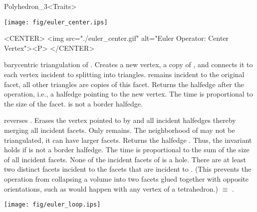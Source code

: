 \begin{ccRefClass}{Polyhedron_3<Traits>}
\begin{ccTexOnly}
    \begin{center}
      \parbox{0.52\textwidth}{%
          \texttt{[image: fig/euler\_center.ips]}%
      }
    \end{center}
\end{ccTexOnly}

\begin{ccHtmlOnly}
    <CENTER>
    <img src="./euler_center.gif" alt="Euler Operator: Center Vertex"><P>
    </CENTER>
\end{ccHtmlOnly}

    {barycentric triangulation of . Creates a new vertex,
     a copy of , and connects it to each vertex incident 
     to  splitting  into triangles. 
      remains incident to the original facet, all other triangles 
     are copies of this facet. Returns the halfedge 
     after the operation, i.e., a halfedge pointing to the new vertex.
     The time is proportional to the size of the facet.
     \ccPrecond {} is not a border halfedge.}

    {reverses . Erases the
     vertex pointed to by  and all incident halfedges thereby
     merging all incident facets. Only  remains. 
     The neighborhood of  may not be triangulated,
     it can have larger facets. Returns the halfedge .
     Thus, the invariant  holds if  is not a border halfedge.
     The time is proportional to the sum of the size of all incident facets.
     \ccPrecond None of the incident facets of  is 
     a hole. There are at least two distinct facets incident
     to the facets that are incident to . (This 
     prevents the operation from collapsing a volume into two facets
     glued together with opposite orientations, such as would
     happen with any vertex of a tetrahedron.)
      $\equiv$ .}



\begin{ccTexOnly}
    \begin{center}
      \parbox{0.636\textwidth}{%
          \texttt{[image: fig/euler\_loop.ips]}%
      }
    \end{center}
\end{ccTexOnly}


\end{ccRefClass}
